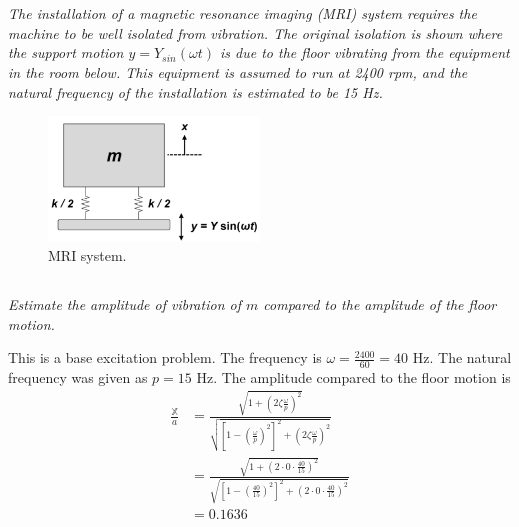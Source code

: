 \section{}

\textit{The installation of a magnetic resonance imaging (MRI) system requires the machine to be well isolated from vibration. The original isolation is shown where the support motion $y = Y_{sin}(\omega t)$ is due to the floor vibrating from the equipment in the room below. This equipment is assumed to run at 2400 rpm, and the natural frequency of the installation is estimated to be 15 Hz.}

\begin{figure}[H]
    \centering
    \includegraphics[width=0.5\textwidth]{Questions/Figures/Q2 Problem Diagram.png}
    \caption{MRI system.}
    \label{fig:Q2}
\end{figure}


\subsection{}
\textit{Estimate the amplitude of vibration of $m$ compared to the amplitude of the floor motion.}

This is a base excitation problem. The frequency is $\omega = \frac{2400}{60} = 40$ Hz. The natural frequency was given as $p = 15$ Hz.
The amplitude compared to the floor motion is 
\begin{align*}
    \frac{\mathbb{X}}{a} &= \frac{\sqrt{1 + \left(2 \zeta \frac{\omega}{p}\right)^2}}{\sqrt{\left[1 - \left(\frac{\omega}{p}\right)^2\right]^2 + \left(2\zeta\frac{\omega}{p}\right)^2}} \\
    &= \frac{\sqrt{1 + \left(2 \cdot 0 \cdot \frac{40}{15}\right)^2}}{\sqrt{\left[1 - \left(\frac{40}{15}\right)^2\right]^2 + \left(2 \cdot 0 \cdot \frac{40}{15}\right)^2}} \\
    &= \boxed{0.1636}
\end{align*}

